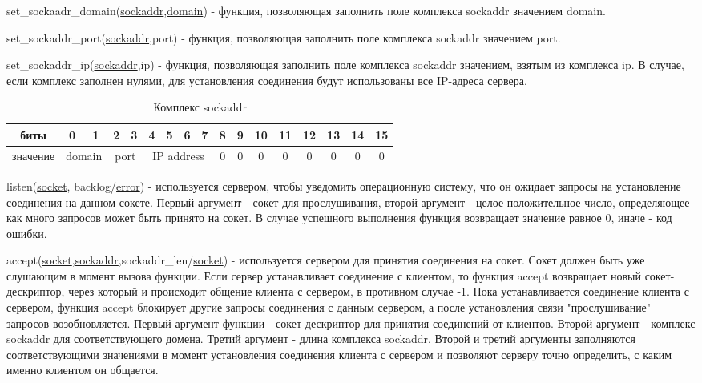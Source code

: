 \documentclass[12t]{article}
\begin{document}
\label{set_sockaddr_domain}
set\_sockaadr\_domain(\hyperref[sockaddr]{sockaddr},\hyperref[domain]{domain}) - функция, позволяющая заполнить поле комплекса sockaddr значением domain.

\label{set_sockaddr_port}
set\_sockaddr\_port(\hyperref[sockaddr]{sockaddr},port) - функция, позволяющая заполнить поле комплекса sockaddr значением port.

\label{set_sockaddr_ip}
set\_sockaddr\_ip(\hyperref[sockaddr]{sockaddr},ip) - функция, позволяющая заполнить поле комплекса sockaddr значением, взятым из комплекса ip. В случае, если комплекс заполнен нулями, для установления соединения будут использованы все IP-адреса сервера.

\begin{table}[H]
\caption{\label{sockaddr}Комплекс sockaddr}
\begin{center}
\begin{tabular}{|c|c|c|c|c|c|c|c|c|c|c|c|c|c|c|c|c|}
\hline
биты & 0 & 1 & 2 & 3 & 4 & 5 & 6 & 7 & 8 & 9 & 10 & 11 & 12 & 13 & 14 & 15 \\
\hline
значение & \multicolumn{2}{|c|}{domain} & \multicolumn{2}{|c|}{port} & \multicolumn{4}{|c|}{IP address} & 0 & 0 & 0 & 0 & 0 & 0 & 0 & 0 \\
\hline
\end{tabular}
\end{center}
\end{table}

\label{listen}
listen(\hyperref[socket]{socket}, backlog/\hyperref[error]{error}) - используется сервером, чтобы уведомить операционную систему, что он ожидает запросы на установление соединения на данном сокете. Первый аргумент - сокет для прослушивания, второй аргумент - целое положительное число, определяющее как много запросов может быть принято на сокет. В случае успешного выполнения функция возвращает значение равное 0, иначе - код ошибки.

\label{accept}
accept(\hyperref[socket]{socket},\hyperref[sockaddr]{sockaddr},sockaddr\_len/\hyperref[socket]{socket}) - используется сервером для принятия соединения на сокет. Сокет должен быть уже слушающим в момент вызова функции. Если сервер устанавливает соединение с клиентом, то функция accept возвращает новый сокет-дескриптор, через который и происходит общение клиента с сервером, в противном случае -1. Пока устанавливается соединение клиента с сервером, функция accept блокирует другие запросы соединения с данным сервером, а после установления связи "прослушивание" запросов возобновляется. Первый аргумент функции - сокет-дескриптор для принятия соединений от клиентов. Второй аргумент - комплекс sockaddr для соответствующего домена. Третий аргумент - длина комплекса sockaddr. Второй и третий аргументы заполняются соответствующими значениями в момент установления соединения клиента с сервером и позволяют серверу точно определить, с каким именно клиентом он общается.
\end{document}
